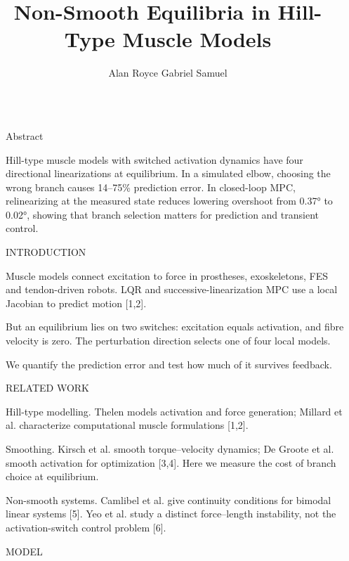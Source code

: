 \documentclass[final]{beamer}
\title{Non-Smooth Equilibria in Hill-Type Muscle Models}
\author{Alan Royce Gabriel Samuel}
\institute{Indian Institute of Technology Madras, Chennai, India}
\newlength{\sepwidth}
\newlength{\colwidth}
\newcommand{\separatorcolumn}{\begin{column}{\sepwidth}\end{column}}
\newcommand{\chip}[1]{%
  \tikz[baseline=(n.base)]{\node[fill=accent,text=white,rounded corners=1.2mm,
    inner xsep=2.4mm,inner ysep=1.0mm,font=\bfseries](n){#1};}\hspace{0.6ex}}
\begin{document}
\begin{frame}[t]
\begin{columns}[t]
\separatorcolumn

\begin{column}{\colwidth}

  \begin{block}{\chip{1} Abstract}

    Hill-type muscle models with switched activation dynamics have four directional linearizations at equilibrium. In a simulated elbow, choosing the wrong branch causes 14–75\% prediction error. In closed-loop MPC, relinearizing at the measured state reduces lowering overshoot from 0.37° to 0.02°, showing that branch selection matters for prediction and transient control.


  \end{block}

  \begin{block}{INTRODUCTION}

    Muscle models connect excitation to force in prostheses, exoskeletons, FES and tendon-driven robots. LQR and successive-linearization MPC use a local Jacobian to predict motion [1,2]. 
    
    But an equilibrium lies on two switches: excitation equals activation, and fibre velocity is zero. The perturbation direction selects one of four local models. 
    
    We quantify the prediction error and test how much of it survives feedback.


  \end{block}

  \begin{block}{RELATED WORK}

    Hill-type modelling. Thelen models activation and force generation; Millard et al. characterize computational muscle formulations [1,2].
    
    Smoothing. Kirsch et al. smooth torque–velocity dynamics; De Groote et al. smooth activation for optimization [3,4]. Here we measure the cost of branch choice at equilibrium.
    
    Non-smooth systems. Camlibel et al. give continuity conditions for bimodal linear systems [5]. Yeo et al. study a distinct force–length instability, not the activation-switch control problem [6].


  \end{block}

  \begin{block}{MODEL}


\end{block}
\end{column}
\end{columns}
\end{frame}
\end{document}
